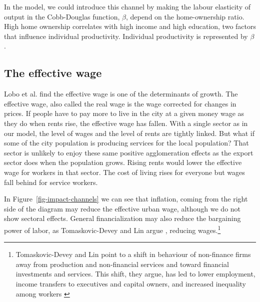 In the model, we could introduce this channel by making the labour \gls{elasticity} of output in the Cobb-Douglas function, $\beta$, depend on the home-ownership ratio. High home ownership correlates with high income and high education, two factors that influence individual productivity. Individual productivity is represented by $\beta$. %


\subsection{The effective wage}
 Lobo et al. \cite{loboUrbanScalingProduction2013} find the \gls{effective wage} is one of the determinants of growth. The effective wage, also called the real wage is the wage corrected for changes in prices. If people have to pay more to live in the city at a given money wage as they do when rents rise, the effective wage has fallen. With a single sector as in our model, the level of wages and the level of rents are tightly linked. But what if some of the city population is producing services for the local population? That sector is unlikely to enjoy these same positive agglomeration effects as the export sector does when the population grows. Rising rents would lower the effective wage for workers in that sector. The cost of living rises for everyone but wages fall behind for service workers.  %

In Figure~\ref{fig-impact-channels} we can see that inflation, coming from the right side of the diagram may reduce the effective urban wage, although we do not show sectoral effects. 
General financialization may also reduce the bargaining power of labor, as Tomaskovic-Devey and Lin argue \cite{tomaskovic-deveyFinancializationCausesInequality2013}, reducing wages.\footnote{Tomaskovic-Devey and Lin point to a shift in behaviour of non-finance firms away from production and non-financial services and toward financial investments and services. This shift, they argue, has led to lower employment, income transfers to executives and capital owners, and increased inequality among workers \cite{tomaskovic-deveyFinancializationCausesInequality2013}}






